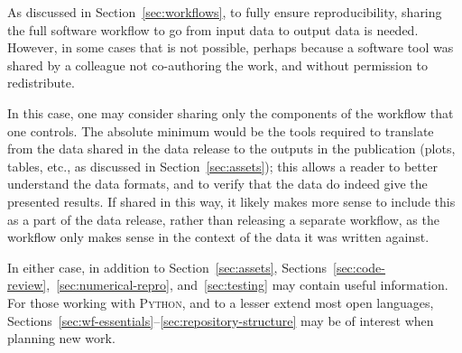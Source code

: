 \documentclass{article}
\begin{document}
As discussed in Section~\ref{sec:workflows},
to fully ensure reproducibility,
sharing the full software workflow to go from input data to output data is needed.
However,
in some cases that is not possible,
perhaps because a software tool was shared by a colleague not co-authoring the work,
and without permission to redistribute.

In this case,
one may consider sharing only the components of the workflow that one controls.
The absolute minimum would be the tools required to translate
from the data shared in the data release
to the outputs in the publication
(plots, tables, etc.,
as discussed in Section~\ref{sec:assets});
this allows a reader to better understand the data formats,
and to verify that the data do indeed give the presented results.
If shared in this way,
it likely makes more sense to include this as a part of the data release,
rather than releasing a separate workflow,
as the workflow only makes sense in the context of the data it was written against.

In either case,
in addition to Section~\ref{sec:assets},
Sections~\ref{sec:code-review},~\ref{sec:numerical-repro}, and~\ref{sec:testing}
may contain useful information.
For those working with \textsc{Python},
and to a lesser extend most open languages,
Sections~\ref{sec:wf-essentials}--\ref{sec:repository-structure} may be of interest
when planning new work.
\end{document}
